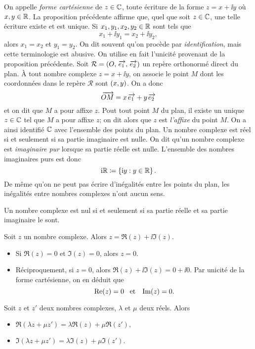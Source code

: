 \documentclass{magnoliaold}
\begin{document}
\begin{remarques}
\remarque On appelle \emph{forme cartésienne} de $z\in\mathbb{C}$, toute écriture de la forme $z=x+\ii y$ où $x,y\in\mathbb{R}$. La proposition précédente affirme que, quel que soit $z\in\mathbb{C}$, une telle écriture existe et est unique.
\remarque Si $x_1,y_1,x_2,y_2\in\mathbb{R}$ sont tels que
  \[x_1+\ii y_1=x_2+\ii y_2,\]
  alors $x_1=x_2$ et $y_1=y_2$. On dit souvent qu'on procède par \emph{identification}, mais cette terminologie est abusive. On utilise en fait l'unicité provenant de la proposition précédente.
\remarque Soit $\mathcal{R}=\left(O,\kern 2pt\overrightarrow{\kern -2pte_1},\kern 2pt\overrightarrow{\kern -2pte_2}\right)$ un repère orthonormé
  direct du plan. À tout nombre complexe $z=x+\ii y$, on associe le point $M$ dont les coordonnées dans le repère
  $\mathcal{R}$ sont $\left(x,y\right)$. On a donc
  \[\kern 2pt\overrightarrow{\kern -2ptOM}=x\kern 2pt\overrightarrow{\kern -2pte_1}+y\kern 2pt\overrightarrow{\kern -2pte_2}\]
  et on dit que $M$ a pour affixe $z$. Pout tout point $M$ du plan, il existe un unique $z\in\mathbb{C}$ tel que
  $M$ a pour affixe $z$; on dit alors que $z$ est \emph{l'affixe} du point $M$. On a ainsi identifié
  $\mathbb{C}$ avec l'ensemble des points du plan.
\remarque Un nombre complexe est réel si et seulement si sa partie imaginaire est nulle. On dit qu'un nombre complexe
  est \emph{imaginaire pur} lorsque sa partie réelle est nulle. L'ensemble des nombres imaginaires purs est
  donc
  \[{\rm i}\mathbb{R}\coloneqq\left\{{\rm i} y : y\in\mathbb{R}\right\}.\]
\remarque De même qu'on ne peut pas écrire d'inégalités entre les points du plan, les inégalités entre nombres
  complexes n'ont aucun sens.
\end{remarques}

\begin{proposition}[utile=-3]
Un nombre complexe est nul si et seulement si sa partie réelle et sa partie imaginaire le sont.
\end{proposition}

\begin{preuve}
Soit $z$ un nombre complexe. Alors $z=\Re(z)+\ii \Im(z)$. 
\begin{itemize}
\item Si $\Re(z)=0$ et $\Im(z)=0$, alors $z=0$.
\item Réciproquement, si $z=0$, alors $\Re(z)+\ii \Im(z)=0+\ii 0$. Par unicité de la forme cartésienne, on en déduit que
  \[\mathop{\rm Re}(z)=0 \quad\!\text{et}\quad\! \mathop{\rm Im}(z)=0.\]
\end{itemize}
\end{preuve}

\begin{proposition}[utile=-3]
Soit $z$ et $z'$ deux nombres complexes, $\lambda$ et $\mu$ deux réels. Alors
\begin{itemize}
\item $\Re(\lambda z+\mu z')=\lambda\Re(z)+\mu\Re(z'),$
\item $\Im(\lambda z+\mu z')=\lambda\Im(z)+\mu\Im(z').$
\end{itemize}
\end{proposition}
\end{document}
